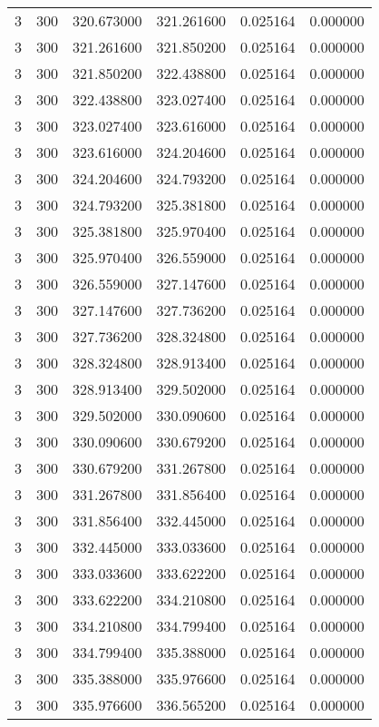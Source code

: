 \begin{longtable}{rrrrrr}
3 & 300 & 320.673000 & 321.261600 & 0.025164 & 0.000000 \\
3 & 300 & 321.261600 & 321.850200 & 0.025164 & 0.000000 \\
3 & 300 & 321.850200 & 322.438800 & 0.025164 & 0.000000 \\
3 & 300 & 322.438800 & 323.027400 & 0.025164 & 0.000000 \\
3 & 300 & 323.027400 & 323.616000 & 0.025164 & 0.000000 \\
3 & 300 & 323.616000 & 324.204600 & 0.025164 & 0.000000 \\
3 & 300 & 324.204600 & 324.793200 & 0.025164 & 0.000000 \\
3 & 300 & 324.793200 & 325.381800 & 0.025164 & 0.000000 \\
3 & 300 & 325.381800 & 325.970400 & 0.025164 & 0.000000 \\
3 & 300 & 325.970400 & 326.559000 & 0.025164 & 0.000000 \\
3 & 300 & 326.559000 & 327.147600 & 0.025164 & 0.000000 \\
3 & 300 & 327.147600 & 327.736200 & 0.025164 & 0.000000 \\
3 & 300 & 327.736200 & 328.324800 & 0.025164 & 0.000000 \\
3 & 300 & 328.324800 & 328.913400 & 0.025164 & 0.000000 \\
3 & 300 & 328.913400 & 329.502000 & 0.025164 & 0.000000 \\
3 & 300 & 329.502000 & 330.090600 & 0.025164 & 0.000000 \\
3 & 300 & 330.090600 & 330.679200 & 0.025164 & 0.000000 \\
3 & 300 & 330.679200 & 331.267800 & 0.025164 & 0.000000 \\
3 & 300 & 331.267800 & 331.856400 & 0.025164 & 0.000000 \\
3 & 300 & 331.856400 & 332.445000 & 0.025164 & 0.000000 \\
3 & 300 & 332.445000 & 333.033600 & 0.025164 & 0.000000 \\
3 & 300 & 333.033600 & 333.622200 & 0.025164 & 0.000000 \\
3 & 300 & 333.622200 & 334.210800 & 0.025164 & 0.000000 \\
3 & 300 & 334.210800 & 334.799400 & 0.025164 & 0.000000 \\
3 & 300 & 334.799400 & 335.388000 & 0.025164 & 0.000000 \\
3 & 300 & 335.388000 & 335.976600 & 0.025164 & 0.000000 \\
3 & 300 & 335.976600 & 336.565200 & 0.025164 & 0.000000 \\

\end{longtable}
